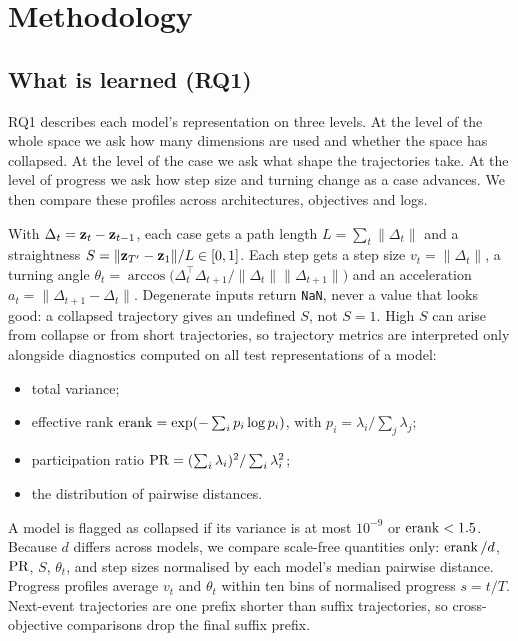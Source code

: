 \section{Methodology}\label{sec:method}

\subsection{What is learned (RQ1)}\label{sec:method-traj}
RQ1 describes each model's representation on three levels. At the level of
the whole space we ask how many dimensions are used and whether the space has
collapsed. At the level of the case we ask what shape the trajectories take.
At the level of progress we ask how step size and turning change as a case
advances. We then compare these profiles across architectures, objectives and
logs.

With $\Delta_t=\mathbf{z}_t-\mathbf{z}_{t-1}$, each case gets a path length
$L=\sum_t\|\Delta_t\|$ and a straightness $S=\|\mathbf{z}_{T'}-\mathbf{z}_1\|/L\in[0,1]$. Each
step gets a step size $v_t=\|\Delta_t\|$, a turning angle
$\theta_t=\arccos\big(\Delta_t^{\top}\Delta_{t+1}/\|\Delta_t\|\|\Delta_{t+1}\|\big)$
and an acceleration $a_t=\|\Delta_{t+1}-\Delta_t\|$. Degenerate inputs return
\texttt{NaN}, never a value that looks good: a collapsed trajectory gives an
undefined $S$, not $S=1$. High $S$ can arise from collapse or from short
trajectories, so trajectory metrics are interpreted only alongside
diagnostics computed on all test representations of a model:
\begin{itemize}[leftmargin=1.2em,itemsep=0pt,topsep=1pt]
  \item total variance;
  \item effective rank $\operatorname{erank}=\exp(-\sum_i p_i\log p_i)$, with $p_i=\lambda_i/\sum_j\lambda_j$;
  \item participation ratio $\operatorname{PR}=(\sum_i\lambda_i)^2/\sum_i\lambda_i^2$;
  \item the distribution of pairwise distances.
\end{itemize}
A model is flagged as collapsed if its variance is at most $10^{-9}$ or
$\operatorname{erank}<1.5$. Because $d$ differs across models, we compare scale-free
quantities only: $\operatorname{erank}/d$, $\operatorname{PR}$, $S$, $\theta_t$, and step sizes normalised
by each model's median pairwise distance. Progress profiles average $v_t$ and
$\theta_t$ within ten bins of normalised progress $s=t/T$. Next-event
trajectories are one prefix shorter than suffix trajectories, so cross-objective
comparisons drop the final suffix prefix.

